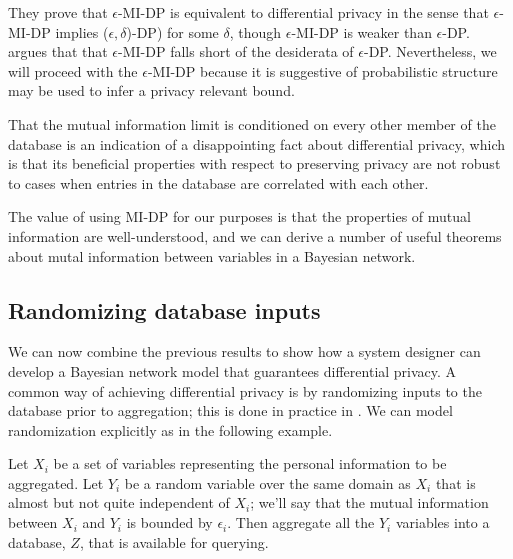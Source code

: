 \documentclass[../thesis.tex]{subfiles}
\begin{document}
They prove that $\epsilon$-MI-DP is equivalent to differential
privacy in the sense that $\epsilon$-MI-DP implies
($\epsilon,\delta$)-DP) for some $\delta$, though
$\epsilon$-MI-DP is weaker than $\epsilon$-DP.
\cite{mcsherry_2017} argues that that $\epsilon$-MI-DP
falls short of the desiderata of $\epsilon$-DP.
Nevertheless, we will proceed with the
$\epsilon$-MI-DP because it is suggestive of
probabilistic structure may be used to
infer a privacy relevant bound.

That the mutual information limit
is conditioned on every other member of the database is
an indication of a disappointing fact about differential
privacy, which is that its beneficial properties
with respect to preserving privacy are not robust
to cases when entries in the database are correlated with each
other.

The value of using MI-DP for our purposes is that
the properties of mutual information are well-understood,
and we can derive a number of useful theorems
about mutal information between variables in a Bayesian
network.

\subsection{Randomizing database inputs}

We can now combine the previous results to
show how a system designer can develop a
Bayesian network model that guarantees
differential privacy.
A common way of achieving differential privacy
is by randomizing inputs to the database
prior to aggregation; this is done in practice
in \cite{erlingsson2014rappor}.
We can model randomization explicitly as in
the following example.

Let $X_i$ be a set of variables representing the
personal information to be aggregated.
Let $Y_i$ be a random variable over the same domain
as $X_i$ that is almost but not quite independent
of $X_i$; we'll say that the mutual information between
$X_i$ and $Y_i$ is bounded by $\epsilon_i$.
Then aggregate all the $Y_i$ variables into a database,
$Z$, that is available for querying.

\begin{center}
\end{center}
\end{document}
